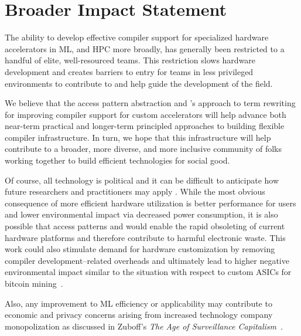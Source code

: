 \section{Broader Impact Statement}

The ability to develop effective compiler support for
  specialized hardware accelerators in ML,
  and HPC more broadly,
  has generally been restricted to a handful of
  elite, well-resourced teams.
This restriction slows hardware development
  and creates barriers to entry for teams in
  less privileged environments to contribute to
  and help guide the development of the field.

We believe that the access pattern abstraction
  and \g's approach to term rewriting for
  improving compiler support for custom
  accelerators will help advance both
  near-term practical and longer-term principled
  approaches to building flexible compiler infrastructure.
In turn, we hope that this infrastructure will
  help contribute to a broader, more diverse, and
  more inclusive community of folks working
  together to build efficient technologies for social
  good.
  
Of course, all technology is political and it can
  be difficult to anticipate how future
  researchers and practitioners may apply \g.
While the most obvious consequence of more
  efficient hardware utilization is better
  performance for users and lower environmental
  impact via decreased power consumption,
  it is also possible that access patterns and \g
  would enable the rapid obsoleting of current
  hardware platforms and therefore contribute
  to harmful electronic waste.
This work could also stimulate
  demand for hardware customization by
  removing compiler development--related overheads and
  ultimately lead to higher negative
  environmental impact similar to the
  situation with respect to custom ASICs
  for bitcoin mining~\cite{qin2020bitcoins}.

Also,
  any improvement to ML efficiency or applicability
  may contribute to economic and privacy concerns
  arising from increased technology company monopolization
  as discussed in Zuboff's
  \textit{The Age of Surveillance Capitalism}~\citep{surveillance}.
